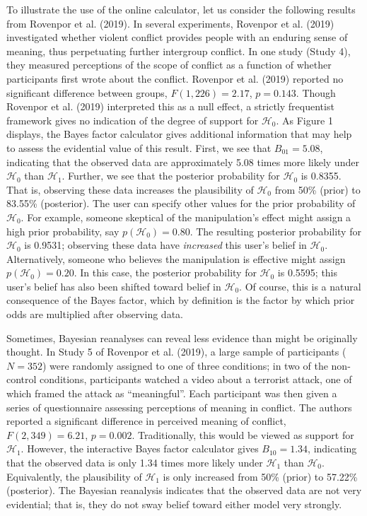 \documentclass[doc]{apa6}
\begin{document}
To illustrate the use of the online calculator, let us consider the following results from Rovenpor et al. (2019). In several experiments, Rovenpor et al. (2019) investigated whether violent conflict provides people with an enduring sense of meaning, thus perpetuating further intergroup conflict. In one study (Study 4), they measured perceptions of the scope of conflict as a function of whether participants first wrote about the conflict. Rovenpor et al. (2019) reported no significant difference between groups, \(F(1,226)=2.17\), \(p=0.143\). Though Rovenpor et al. (2019) interpreted this as a null effect, a strictly frequentist framework gives no indication of the degree of support for \(\mathcal{H}_0\). As Figure 1 displays, the Bayes factor calculator gives additional information that may help to assess the evidential value of this result. First, we see that \(B_{01}=5.08\), indicating that the observed data are approximately 5.08 times more likely under \(\mathcal{H}_0\) than \(\mathcal{H}_1\). Further, we see that the posterior probability for \(\mathcal{H}_0\) is 0.8355. That is, observing these data increases the plausibility of \(\mathcal{H}_0\) from 50\% (prior) to 83.55\% (posterior). The user can specify other values for the prior probability of \(\mathcal{H}_0\). For example, someone skeptical of the manipulation's effect might assign a high prior probability, say \(p(\mathcal{H}_0)=0.80\). The resulting posterior probability for \(\mathcal{H}_0\) is 0.9531; observing these data have \emph{increased} this user's belief in \(\mathcal{H}_0\). Alternatively, someone who believes the manipulation is effective might assign \(p(\mathcal{H}_0)=0.20\). In this case, the posterior probability for \(\mathcal{H}_0\) is 0.5595; this user's belief has also been shifted toward belief in \(\mathcal{H}_0\). Of course, this is a natural consequence of the Bayes factor, which by definition is the factor by which prior odds are multiplied after observing data. 

Sometimes, Bayesian reanalyses can reveal less evidence than might be originally thought. In Study 5 of Rovenpor et al. (2019), a large sample of participants (\(N=352\)) were randomly assigned to one of three conditions; in two of the non-control conditions, participants watched a video about a terrorist attack, one of which framed the attack as \enquote{meaningful}. Each participant was then given a series of questionnaire assessing perceptions of meaning in conflict. The authors reported a significant difference in perceived meaning of conflict, \(F(2,349)= 6.21\), \(p=0.002\). Traditionally, this would be viewed as support for \(\mathcal{H}_1\). However, the interactive Bayes factor calculator gives \(B_{10}=1.34\), indicating that the observed data is only 1.34 times more likely under \(\mathcal{H}_1\) than \(\mathcal{H}_0\). Equivalently, the plausibility of \(\mathcal{H}_1\) is only increased from 50\% (prior) to 57.22\% (posterior). The Bayesian reanalysis indicates that the observed data are not very evidential; that is, they do not sway belief toward either model very strongly.
\end{document}
